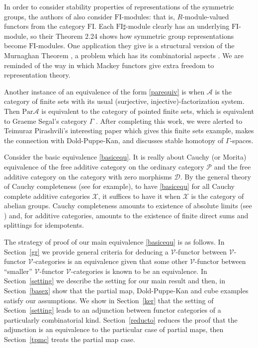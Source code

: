 \documentclass[a4paper,12pt,reqno]{amsart}
\theoremstyle{definition}
\theoremstyle{fact}
\theoremstyle{genquest}
\theoremstyle{step}
\def\CA{{\mathscr A}}
\def\CD{{\mathscr D}}
\def\CP{{\mathscr P}}
\def\CV{{\mathscr V}}
\def\CX{{\mathscr X}}
\begin{document}
In order to consider stability properties of representations of the symmetric groups, 
the authors of \cite{CEF2012} also consider $\mathrm{FI}$-modules: 
that is, $R$-module-valued functors from the category $\mathrm{FI}$. 
Each $\mathrm{FI}\sharp$-module
clearly has an underlying $\mathrm{FI}$-module, so their Theorem 2.24
shows how symmetric group representations become $\mathrm{FI}$-modules.
One application they give is a structural version of the Murnaghan Theorem
\cite{Mur38, Mur55}, a problem which has its combinatorial aspects \cite{Sta99}. 
We are reminded of the way in which Mackey functors
\cite{Lindner1976, PanSt} give extra freedom to representation theory.

Another instance of an equivalence of the form \eqref{parequiv} is when
$\CA$ is the category of finite sets with its usual (surjective, injective)-factorization
system. Then $\mathrm{Par}\CA$ is equivalent to the 
category of pointed finite sets,
which is equivalent to Graeme Segal's category $\Gamma$ \cite{Segal}. 
After completing this work, we were alerted to Teimuraz Pirashvili's interesting 
paper \cite{Pirash00} which gives this finite sets example, 
makes the connection with Dold-Puppe-Kan, and discusses stable homotopy of 
$\Gamma$-spaces.  

Consider the basic equivalence \eqref{basicequ}. It is really about Cauchy (or Morita)
equivalence of the free additive category on the ordinary category $\CP$
and the free additive category on the category with zero morphisms $\CD$. 
By the general theory of Cauchy completeness (see \cite{ECC} for example),
to have \eqref{basicequ} for all Cauchy complete additive categories $\CX$, it
suffices to have it when $\CX$ is the category of abelian groups. 
Cauchy completeness amounts to existence of absolute limits (see \cite{ACEC})
and, for additive categories,
amounts to the existence of finite direct sums and splittings for idempotents. 

The strategy of proof of our main equivalence \eqref{basicequ} is as follows.
In Section~\ref{gr} we provide general criteria for deducing a $\CV$-functor
between $\CV$-functor $\CV$-categories is an equivalence given that some other
$\CV$-functor between ``smaller'' $\CV$-functor $\CV$-categories is known to
be an equivalence. 
In Section~\ref{setting} we describe the setting for our main result and then,
in Section~\ref{basex} show that the partial map, Dold-Puppe-Kan and 
cube examples satisfy our assumptions. 
We show in Section~\ref{ker} that the setting of Section~\ref{setting} 
leads to an adjunction between functor categories of a particularly combinatorial kind.
Section~\ref{reducto} reduces the proof that the adjunction is an equivalence to the
particular case of partial maps, then Section~\ref{tpmc} treats the partial map case.
\end{document}
